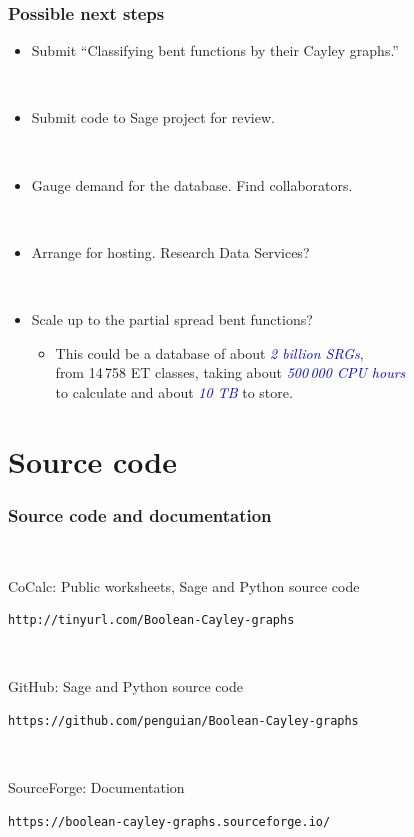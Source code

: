 \documentclass[pdf,sprung,slideColor,nocolorBG]{beamer}
\newenvironment{colortheme}[1]{
\def\ProvidesPackageRCS $##1${\relax}
\renewcommand{\ProcessOptions}{\relax}
\makeatletter

\makeatother
}{}
\newcommand{\Emph}[1]{\emph{\textcolor{blue}{#1}}}
\begin{document}
\begin{colortheme}{jubata}

\begin{frame}[fragile]
\frametitle{Possible next steps}

\begin{itemize}
 \item
Submit ``Classifying bent functions by their Cayley graphs.''

~

 \item
Submit code to Sage project for review.

~

 \item
Gauge demand for the database. Find collaborators.

~

 \item
Arrange for hosting. Research Data Services?

~

 \item
Scale up to the partial spread bent functions?

 \begin{itemize}
  \item
This could be a database of about \Emph{2 billion SRGs},
\\
from 14\,758 ET classes, taking about \Emph{500\,000 CPU hours}
\\
to calculate and about \Emph{10 TB} to store.
 \end{itemize}
\end{itemize}
\end{frame}

\end{colortheme}

\section{Source code}

\begin{colortheme}{jubata}

\begin{frame}[fragile]
\frametitle{Source code and documentation}
~

CoCalc: Public worksheets, Sage and Python source code

\begin{verbatim}
http://tinyurl.com/Boolean-Cayley-graphs
\end{verbatim}

~

GitHub: Sage and Python source code

\begin{verbatim}
https://github.com/penguian/Boolean-Cayley-graphs
\end{verbatim}

~

SourceForge: Documentation

\begin{verbatim}
https://boolean-cayley-graphs.sourceforge.io/
\end{verbatim}
\end{frame}

\end{colortheme}
\end{document}
